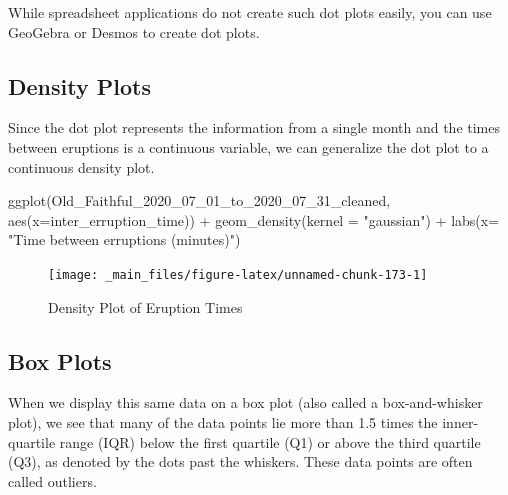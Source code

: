 \documentclass[
]{book}
\newenvironment{Shaded}{\begin{snugshade}}{\end{snugshade}}
\newcommand{\AttributeTok}[1]{\textcolor[rgb]{0.77,0.63,0.00}{#1}}
\newcommand{\FunctionTok}[1]{\textcolor[rgb]{0.00,0.00,0.00}{#1}}
\newcommand{\NormalTok}[1]{#1}
\newcommand{\SpecialCharTok}[1]{\textcolor[rgb]{0.00,0.00,0.00}{#1}}
\newcommand{\StringTok}[1]{\textcolor[rgb]{0.31,0.60,0.02}{#1}}
\theoremstyle{definition}
\theoremstyle{definition}
\theoremstyle{definition}
\theoremstyle{definition}
\theoremstyle{remark}
\begin{document}
While spreadsheet applications do not create such dot plots easily, you can use GeoGebra or Desmos to create dot plots.

\hypertarget{density-plots}{%
\subsection{Density Plots}\label{density-plots}}

Since the dot plot represents the information from a single month and the times between eruptions is a continuous variable, we can generalize the dot plot to a continuous density plot.

\begin{Shaded}
\begin{Highlighting}[]
\FunctionTok{ggplot}\NormalTok{(Old\_Faithful\_2020\_07\_01\_to\_2020\_07\_31\_cleaned, }\FunctionTok{aes}\NormalTok{(}\AttributeTok{x=}\NormalTok{inter\_erruption\_time)) }\SpecialCharTok{+} \FunctionTok{geom\_density}\NormalTok{(}\AttributeTok{kernel =} \StringTok{"gaussian"}\NormalTok{) }\SpecialCharTok{+} \FunctionTok{labs}\NormalTok{(}\AttributeTok{x=} \StringTok{"Time between erruptions (minutes)"}\NormalTok{)}
\end{Highlighting}
\end{Shaded}

\begin{figure}

{\centering \texttt{[image: \_main\_files/figure-latex/unnamed-chunk-173-1]} 

}

\caption{Density Plot of Eruption Times}\label{fig:unnamed-chunk-173}
\end{figure}

\hypertarget{box-plots}{%
\subsection{Box Plots}\label{box-plots}}

When we display this same data on a box plot (also called a box-and-whisker plot), we see that many of the data points lie more than 1.5 times the inner-quartile range (IQR) below the first quartile (Q1) or above the third quartile (Q3), as denoted by the dots past the whiskers. These data points are often called outliers.
\end{document}
